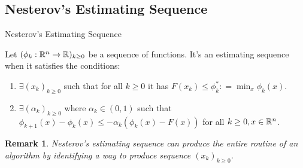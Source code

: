 \documentclass[11pt]{beamer}
\newtheorem{remark}{Remark}
\begin{document}
    \subsection{Nesterov's Estimating Sequence}
        \begin{frame}{Nesterov's Estimating Sequence}            
            \begin{definition}\label{def:nes-est-seq}
                Let $(\phi_k : \mathbb R^n \rightarrow \mathbb R)_{k \ge 0}$ be a sequence of functions. 
                It's an estimating sequence when it satisfies the conditions: 
                \begin{enumerate}
                    \item $\exists (x_k)_{k \ge 0}$ such that for all $k \ge 0$ it has $F(x_k) \le \phi_k^*: =\min_{x}\phi_k(x)$. 
                    \item $\exists (\alpha_k)_{k \ge 0}$ where $\alpha_k \in (0, 1)$ such that $\phi_{k + 1}(x) - \phi_k(x) \le - \alpha_k(\phi_k(x) - F(x))$ for all $k\ge 0, x \in \mathbb R^n$.
                \end{enumerate}
            \end{definition}
            \begin{remark}
                Nesterov's estimating sequence can produce the entire routine of an algorithm by identifying a way to produce sequence $(x_k)_{k \ge 0}$. 
            \end{remark}
        \end{frame}
\end{document}
